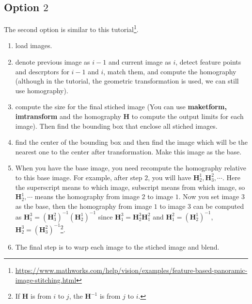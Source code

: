 \documentclass[a4paper]{article}
\begin{document}
\subsection{Option $2$}
The second option is similar to this tutorial\footnote{\url{https://www.mathworks.com/help/vision/examples/feature-based-panoramic-image-stitching.html}}. 
\begin{enumerate}
	\item load images.
	\item denote previous image as $i-1$ and current image as $i$, detect feature points and descrptors for $i-1$ and $i$, match them, and compute the homography (although in the tutorial, the geometric transformation is used, we can still use homography).
	\item compute the size for the final stiched image (You can use \textbf{maketform, imtransform} and the homography $\mathbf{H}$ to compute the output limits for each image). Then find the bounding box that enclose all stiched images.
	\item find the center of the bounding box and then find the image which will be the nearest one to the center after transformation. Make this image as the base.
	\item When you have the base image, you need recompute the homography relative to this base image. For example, after step $2$, you will have $\mathbf{H}_2^1,\mathbf{H}_3^2, \cdots$. Here the superscript means to which image, subscript means from which image, so $\mathbf{H}_2^1, \cdots$ means the homography from image $2$ to image $1$. Now you set image $3$ as the base, then the homography from image $1$ to image $3$ can be computed as $\mathbf{H}_1^3=(\mathbf{H}_3^2)^{-1}(\mathbf{H}_2^1)^{-1}$ since $\mathbf{H}_1^3=\mathbf{H}_2^3\mathbf{H}_1^2$ and $\mathbf{H}_1^2=(\mathbf{H}_2^1)^{-1}$, $\mathbf{H}_2^3=(\mathbf{H}_3^2)^{-1}$\footnote{If $\mathbf{H}$ is from $i$ to $j$, the $\mathbf{H}^{-1}$ is from $j$ to $i$.}. 
	\item The final step is to warp each image to the stiched image and blend.
\end{enumerate}
\end{document}
